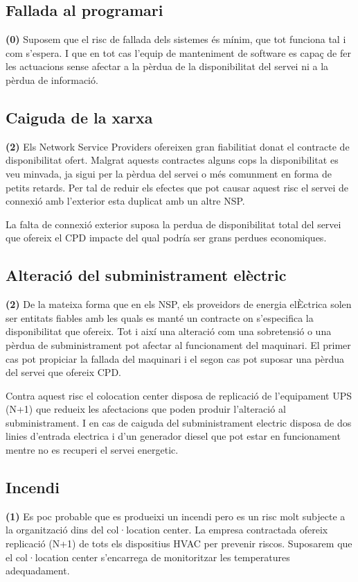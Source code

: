 \subsection{Fallada al programari}
\textbf{(0)} Suposem que el risc de fallada dels sistemes és mínim, que tot funciona tal i com s'espera. I que en tot cas l'equip de manteniment de software es capaç de fer les actuacions sense afectar a la pèrdua de la disponibilitat del servei ni a la pèrdua de informació. 

\subsection{Caiguda de la xarxa}
\textbf{(2)} Els Network Service Providers ofereixen gran fiabilitiat donat el contracte de disponibilitat ofert. Malgrat aquests contractes alguns cops la disponibilitat es veu minvada, ja sigui per la pèrdua del servei o més comunment en forma de petits retards. Per tal de reduir els efectes que pot causar aquest risc el servei de connexió amb l'exterior esta duplicat amb un altre NSP. 

La falta de connexió exterior suposa la perdua de disponibilitat total del servei que ofereix el CPD impacte del qual podría ser grans perdues economiques.

\subsection{Alteració del subministrament elèctric}
\textbf{(2)} De la mateixa forma que en els NSP, els proveidors de energia elÈctrica solen ser entitats fiables amb les quals es manté un contracte on s'especifica la disponibilitat que ofereix. Tot i així una alteració com una sobretensió o una pèrdua de subministrament pot afectar al funcionament del maquinari. El primer cas pot propiciar la fallada del maquinari i el segon cas pot suposar una pèrdua del servei que ofereix CPD.

Contra aquest risc el colocation center disposa de replicació de l'equipament UPS (N+1) que redueix les afectacions que poden produir l'alteració al subministrament. I en cas de caiguda del subministrament electric disposa de dos linies d'entrada electrica i d'un generador diesel que pot estar en funcionament mentre no es recuperi el servei energetic.

\subsection{Incendi}
\textbf{(1)} Es poc probable que es produeixi un incendi pero es un risc molt subjecte a la organització dins del col·location center. La empresa contractada ofereix replicació (N+1) de tots els dispositius HVAC per prevenir riscos. Suposarem que el col·location center s'encarrega de monitoritzar les temperatures adequadament.

